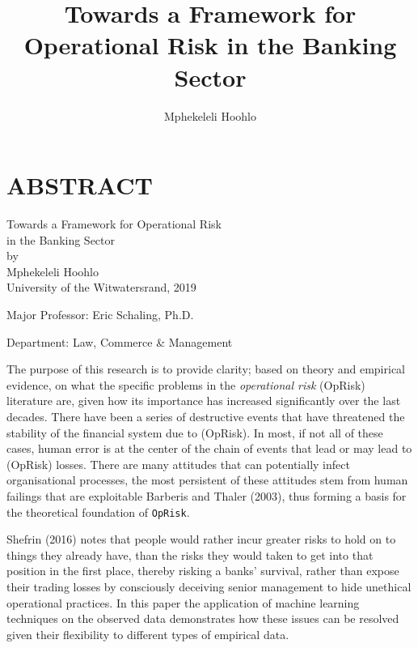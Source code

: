 \documentclass[]{DissertateUSU}
\title{Towards a Framework for Operational Risk in the Banking Sector}
\author{Mphekeleli Hoohlo}
\date{}
\begin{document}
\maketitle

 \pagestyle{empty} \copyrightpage

\newpage

\pagestyle{fancy}  \fancyhead[R]{\thepage}
\fancyfoot[C]{} \chapter*{ABSTRACT}

\doublespacing

\begin{center}
Towards a Framework for Operational Risk \\ 
in the Banking Sector \\
\vspace{12pt}
by \\
\vspace{12pt}
Mphekeleli Hoohlo \\
University of the Witwatersrand, 2019
\end{center}

\vspace{12pt}

\singlespacing
\noindent Major Professor: Eric Schaling, Ph.D.

\noindent Department: Law, Commerce \& Management

\vspace{12pt}

\doublespacing

The purpose of this research is to provide clarity; based on theory and
empirical evidence, on what the specific problems in the
\emph{operational risk} (OpRisk) literature are, given how its
importance has increased significantly over the last decades. There have
been a series of destructive events that have threatened the stability
of the financial system due to (OpRisk). In most, if not all of these
cases, human error is at the center of the chain of events that lead or
may lead to (OpRisk) losses. There are many attitudes that can
potentially infect organisational processes, the most persistent of
these attitudes stem from human failings that are exploitable Barberis
and Thaler (2003), thus forming a basis for the theoretical foundation
of \texttt{OpRisk}.

Shefrin (2016) notes that people would rather incur greater risks to
hold on to things they already have, than the risks they would taken to
get into that position in the first place, thereby risking a banks'
survival, rather than expose their trading losses by consciously
deceiving senior management to hide unethical operational practices. In
this paper the application of machine learning techniques on the
observed data demonstrates how these issues can be resolved given their
flexibility to different types of empirical data.
\end{document}
